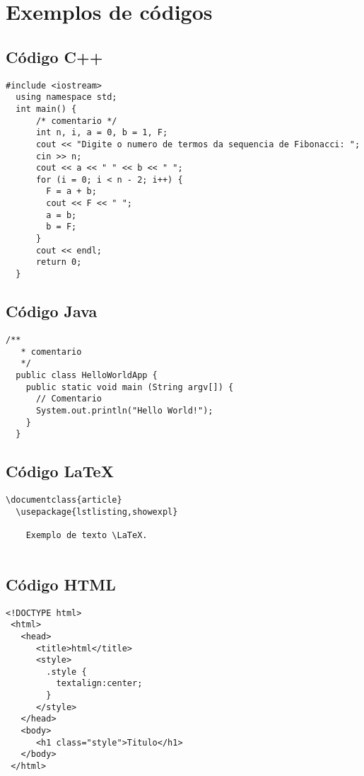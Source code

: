 \chapter{Exemplos de códigos}

\section{Código C++}

\begin{lstlisting}[style=CPP, title={C++}, label=c]
  #include <iostream>
  using namespace std;
  int main() {
      /* comentario */
      int n, i, a = 0, b = 1, F;
      cout << "Digite o numero de termos da sequencia de Fibonacci: ";
      cin >> n;
      cout << a << " " << b << " ";
      for (i = 0; i < n - 2; i++) {
        F = a + b;
        cout << F << " ";
        a = b;
        b = F;
      }
      cout << endl;
      return 0;
  }
\end{lstlisting}

\section{Código Java}

\begin{lstlisting}[style=Java, title=Java]
  /**
   * comentario
   */
  public class HelloWorldApp {
    public static void main (String argv[]) {
      // Comentario
      System.out.println("Hello World!");
    }
  }
\end{lstlisting}

\section{Código \LaTeX}

\begin{lstlisting}[style=LaTeX, title=LaTeX]
  \documentclass{article}
  \usepackage{lstlisting,showexpl}
  
    Exemplo de texto \LaTeX.
  
\end{lstlisting}

\section{Código HTML}

\begin{lstlisting}[style=HTML, title=HTML]
 <!DOCTYPE html>
 <html>
   <head>
      <title>html</title>
      <style>
        .style {
          textalign:center;
        }
      </style>
   </head>
   <body>
      <h1 class="style">Titulo</h1>
   </body>
 </html>
\end{lstlisting}

